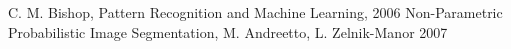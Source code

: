 \begin{thebibliography}{1}
		C. M. Bishop,
		Pattern Recognition and Machine Learning,
		2006
        Non-Parametric Probabilistic Image Segmentation,
		M. Andreetto, L. Zelnik-Manor
		2007
\end{thebibliography}
